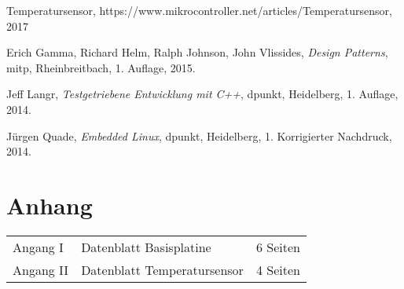 \begin{thebibliography}{9}

 Temperatursensor, https://www.mikrocontroller.net/articles/Temperatursensor, 2017

  Erich Gamma, Richard Helm, Ralph Johnson, John Vlissides,
  \emph{Design Patterns},
  mitp, Rheinbreitbach,
  1. Auflage,
  2015.

  Jeff Langr,
  \emph{Testgetriebene Entwicklung mit C++},
  dpunkt, Heidelberg,
  1. Auflage,
  2014.
  
  Jürgen Quade,
  \emph{Embedded Linux},
  dpunkt, Heidelberg,
  1. Korrigierter Nachdruck,
  2014.

\end{thebibliography}

\listoffigures

\clearpage

\section{Anhang}
\begin{tabular}{lll}
Angang I	& Datenblatt Basisplatine 		& 6 Seiten\\
Angang II	& Datenblatt Temperatursensor	& 4 Seiten\\
\end{tabular}


